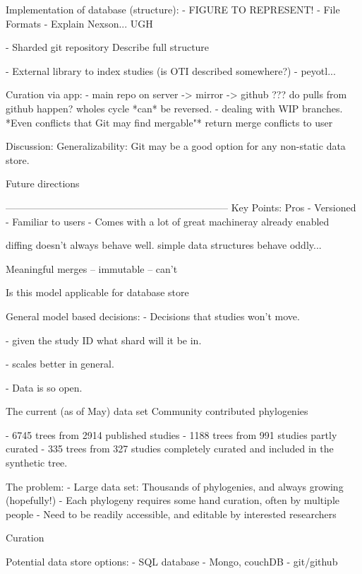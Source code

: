 \documentclass[a4paper,10pt]{article}
\begin{document}
          
 Implementation of database (structure):
      - FIGURE TO REPRESENT!
      - File Formats
         - Explain Nexson... UGH
         
      - Sharded git repository
          Describe full structure 
          
      - External library to index studies (is OTI described somewhere?)
      - peyotl...
      
      Curation via app:
        - main repo on server -> mirror -> github
            ??? do pulls from github happen? wholes cycle *can* be reversed.
        - dealing with WIP branches.
        *Even conflicts that Git may find mergable"*
        return merge conflicts to user

 Discussion:
   Generalizability:
      Git may be a good option for any non-static data store.
      
  Future directions

  
  
  --------------------------------------------------------------------
Key Points:
Pros
 - Versioned
 - Familiar to users
 - Comes with a lot of great machineray already enabled

diffing doesn't always behave well.
simple data structures behave oddly...

Meaningful merges
 -- immutable
 -- can't

Is this model applicable for database store

General model based decisions:
- Decisions that studies won't move.

- given the study ID what shard will it be in.

- scales better in general.

- Data is so open.



 The current (as of May) data set
 Community contributed phylogenies

 - 6745 trees from 2914 published studies
 - 1188 trees from 991 studies partly curated 
 - 335 trees from 327 studies completely curated and included in the synthetic tree.

 The problem:
 - Large data set: Thousands of phylogenies, and always growing (hopefully!)
 - Each phylogeny requires some hand curation, often by multiple people
 - Need to be readily accessible, and editable by interested researchers

Curation

 Potential data store options:
 - SQL database
 - Mongo, couchDB
 - git/github
\end{document}
